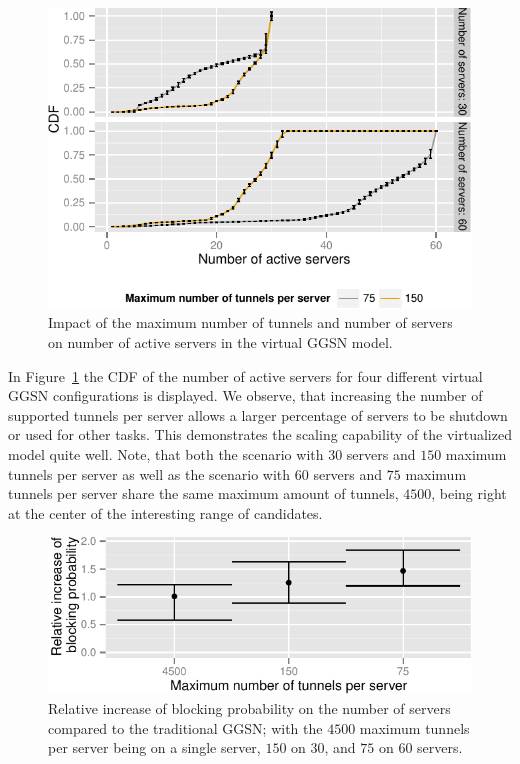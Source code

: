 \begin{figure}[htb]
  \centering
  \includegraphics{images/instanceuse-multiserver-real.pdf}
  \caption{Impact of the maximum number of tunnels and number of servers on number of active servers in the virtual \gls{GGSN} model.}
 \label{c4:fig:instance_use_virtual}
\end{figure}

In Figure~\ref{c4:fig:instance_use_virtual} the \gls{CDF} of the number of active servers for four different virtual \gls{GGSN} configurations is displayed. We observe, that increasing the number of supported tunnels per server allows a larger percentage of servers to be shutdown or used for other tasks. This demonstrates the scaling capability of the virtualized model quite well. Note, that both the scenario with $30$ servers and $150$ maximum tunnels per server as well as the scenario with $60$ servers and $75$ maximum tunnels per server share the same maximum amount of tunnels, $4500$, being right at the center of the interesting range of candidates.


\begin{figure}[htb]
  \centering
  \includegraphics{images/blocking-comparison.pdf}
  \caption{Relative increase of blocking probability on the number of servers compared to the traditional \gls{GGSN}; with the $4500$ maximum tunnels per server being on a single server, $150$ on $30$, and $75$ on $60$ servers.}
 \label{c4:fig:blocking-comparison}
\end{figure}

